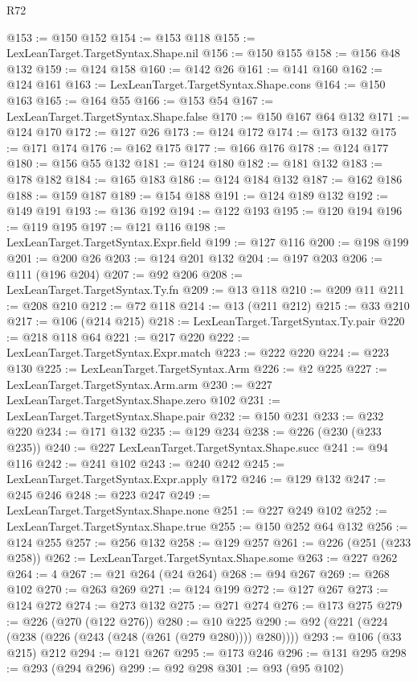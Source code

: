 \begin{lexlean}{R72}
\begin{coremodule}
@153 := @150 @152
@154 := @153 @118
@155 := LexLeanTarget.TargetSyntax.Shape.nil
@156 := @150 @155
@158 := @156 @48 @132
@159 := @124 @158
@160 := @142 @26
@161 := @141 @160
@162 := @124 @161
@163 := LexLeanTarget.TargetSyntax.Shape.cons
@164 := @150 @163
@165 := @164 @55
@166 := @153 @54
@167 := LexLeanTarget.TargetSyntax.Shape.false
@170 := @150 @167 @64 @132
@171 := @124 @170
@172 := @127 @26
@173 := @124 @172
@174 := @173 @132
@175 := @171 @174
@176 := @162 @175
@177 := @166 @176
@178 := @124 @177
@180 := @156 @55 @132
@181 := @124 @180
@182 := @181 @132
@183 := @178 @182
@184 := @165 @183
@186 := @124 @184 @132
@187 := @162 @186
@188 := @159 @187
@189 := @154 @188
@191 := @124 @189 @132
@192 := @149 @191
@193 := @136 @192
@194 := @122 @193
@195 := @120 @194
@196 := @119 @195
@197 := @121 @116
@198 := LexLeanTarget.TargetSyntax.Expr.field
@199 := @127 @116
@200 := @198 @199
@201 := @200 @26
@203 := @124 @201 @132
@204 := @197 @203
@206 := @111 (@196 @204)
@207 := @92 @206
@208 := LexLeanTarget.TargetSyntax.Ty.fn
@209 := @13 @118
@210 := @209 @11
@211 := @208 @210
@212 := @72 @118
@214 := @13 (@211 @212)
@215 := @33 @210
@217 := @106 (@214 @215)
@218 := LexLeanTarget.TargetSyntax.Ty.pair
@220 := @218 @118 @64
@221 := @217 @220
@222 := LexLeanTarget.TargetSyntax.Expr.match
@223 := @222 @220
@224 := @223 @130
@225 := LexLeanTarget.TargetSyntax.Arm
@226 := @2 @225
@227 := LexLeanTarget.TargetSyntax.Arm.arm
@230 := @227 LexLeanTarget.TargetSyntax.Shape.zero @102
@231 := LexLeanTarget.TargetSyntax.Shape.pair
@232 := @150 @231
@233 := @232 @220
@234 := @171 @132
@235 := @129 @234
@238 := @226 (@230 (@233 @235))
@240 := @227 LexLeanTarget.TargetSyntax.Shape.succ
@241 := @94 @116
@242 := @241 @102
@243 := @240 @242
@245 := LexLeanTarget.TargetSyntax.Expr.apply @172
@246 := @129 @132
@247 := @245 @246
@248 := @223 @247
@249 := LexLeanTarget.TargetSyntax.Shape.none
@251 := @227 @249 @102
@252 := LexLeanTarget.TargetSyntax.Shape.true
@255 := @150 @252 @64 @132
@256 := @124 @255
@257 := @256 @132
@258 := @129 @257
@261 := @226 (@251 (@233 @258))
@262 := LexLeanTarget.TargetSyntax.Shape.some
@263 := @227 @262
@264 := 4
@267 := @21 @264 (@24 @264)
@268 := @94 @267
@269 := @268 @102
@270 := @263 @269
@271 := @124 @199
@272 := @127 @267
@273 := @124 @272
@274 := @273 @132
@275 := @271 @274
@276 := @173 @275
@279 := @226 (@270 (@122 @276))
@280 := @10 @225
@290 := @92 (@221 (@224 (@238 (@226 (@243 (@248 (@261 (@279 @280)))) @280))))
@293 := @106 (@33 @215) @212
@294 := @121 @267
@295 := @173 @246
@296 := @131 @295
@298 := @293 (@294 @296)
@299 := @92 @298
@301 := @93 (@95 @102)

\end{coremodule}
\end{lexlean}
